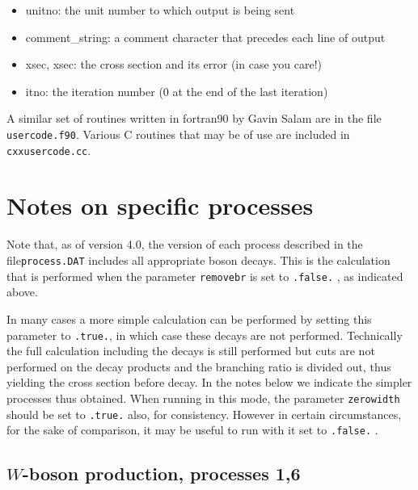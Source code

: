 \documentclass[12pt]{article}
\begin{document}
\begin{itemize}
\begin{itemize}
\item  unitno: the unit number to which output is being sent                                                                         
\item comment\_string: a comment character that precedes each line of output                                                         
\item xsec, xsec: the cross section and its error (in case you care!)                                                               
\item itno: the iteration number (0 at the end of the last iteration)                                                               
\end{itemize}
\end{itemize}

A similar set of routines written in fortran90 by Gavin Salam are in the file {\tt  usercode.f90}.
Various C routines that may be of use are included in {\tt cxxusercode.cc}.

\section{Notes on specific processes}

\label{sec:specific}

Note that, as of version 4.0, the version of each process described in the file{\tt process.DAT} includes 
all appropriate boson decays. This is the calculation
that is performed when the parameter {\tt removebr} is set to {\tt .false.} ,
as indicated above.

In many cases a more simple calculation can be performed by setting this
parameter to {\tt .true.}, in which case these decays are not performed.
Technically the full calculation including the decays
is still performed but cuts are not performed on the decay products and the
branching ratio is divided out, thus yielding the cross section before decay.
In the notes below we indicate the simpler processes thus obtained. When running in
this mode, the parameter {\tt zerowidth} should be set to {\tt .true.} also,
for consistency. However in certain circumstances, for the sake of comparison,
it may be useful to run with it set to {\tt .false.} .

\subsection{$W$-boson production, processes 1,6}
\label{subsec:wboson}
\end{document}
